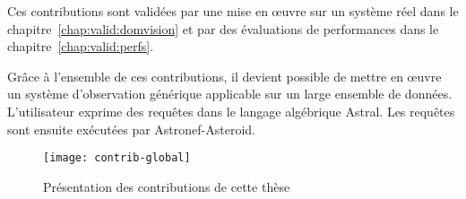 Ces contributions sont validées par une mise en œuvre sur un système réel dans le chapitre~\ref{chap:valid:domvision} et par des évaluations de performances dans le chapitre~\ref{chap:valid:perfs}.

Grâce à l'ensemble de ces contributions, il devient possible de mettre en œuvre un système d'observation générique applicable sur un large ensemble de données. L'utilisateur exprime des requêtes dans le langage algébrique Astral. Les requêtes sont ensuite exécutées par Astronef-Asteroid. 

\begin{figure}[ht]
	\centering
	\texttt{[image: contrib-global]}
	\caption{Présentation des contributions de cette thèse}
\end{figure}
